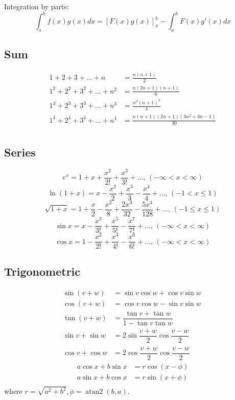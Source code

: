 \documentclass[A4 paper, 12pt, oneside]{article}
\begin{document}
\begin{landscape}
\begin{multicols}{2}
    Integration by parts:
    \[\int_a^bf(x)g(x)dx = [F(x)g(x)]_a^b-\int_a^bF(x)g'(x)dx\]	
	
	\subsection{Sum}
	\begin{align*}
    	1 + 2 + 3 + \dots + n &= \frac{n(n+1)}{2} \\
    	1^2 + 2^2 + 3^2 + \dots + n^2 &= \frac{n(2n+1)(n+1)}{6} \\
    	1^3 + 2^3 + 3^3 + \dots + n^3 &= \frac{n^2(n+1)^2}{4} \\
    	1^4 + 2^4 + 3^4 + \dots + n^4 &= \frac{n(n+1)(2n+1)(3n^2 + 3n - 1)}{30} \\
    \end{align*}
    
    \subsection{Series}
    $$e^x = 1+x+\frac{x^2}{2!}+\frac{x^3}{3!}+\dots,\,(-\infty<x<\infty)$$
    $$\ln(1+x) = x-\frac{x^2}{2}+\frac{x^3}{3}-\frac{x^4}{4}+\dots,\,(-1<x\leq1)$$
    $$\sqrt{1+x} = 1+\frac{x}{2}-\frac{x^2}{8}+\frac{2x^3}{32}-\frac{5x^4}{128}+\dots,\,(-1\leq x\leq1)$$
    $$\sin x = x-\frac{x^3}{3!}+\frac{x^5}{5!}-\frac{x^7}{7!}+\dots,\,(-\infty<x<\infty)$$
    $$\cos x = 1-\frac{x^2}{2!}+\frac{x^4}{4!}-\frac{x^6}{6!}+\dots,\,(-\infty<x<\infty)$$
    
    \subsection{Trigonometric}
    \begin{align*}
        \sin(v+w)&= \sin v\cos w+\cos v\sin w \\
        \cos(v+w)&=\cos v\cos w-\sin v\sin w\ \\
        \tan(v+w)&=\dfrac{\tan v+\tan w}{1-\tan v\tan w} \\
        \sin v+\sin w&=2\sin\dfrac{v+w}{2}\cos\dfrac{v-w}{2} \\
        \cos v+\cos w&=2\cos\dfrac{v+w}{2}\cos\dfrac{v-w}{2} 
    \end{align*}
    \begin{align*}
        a\cos x+b\sin x&=r\cos(x-\phi)\\
        a\sin x+b\cos x&=r\sin(x+\phi)\\
    \end{align*}
    where $r=\sqrt{a^2+b^2}, \phi=\operatorname{atan2}(b,a)$.


\end{multicols}
\end{landscape}
\end{document}
